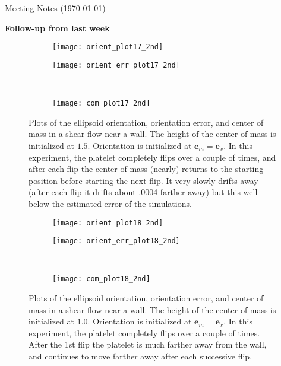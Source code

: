 \documentclass{article}
\newcommand{\vect}[1]{\boldsymbol{\mathbf{#1}}}
\begin{document}
\pagestyle{plain}

\begin{center}
  {\Large Meeting Notes (\today)}
\end{center}

{\large \textbf{Follow-up from last week}}

\begin{figure}[h!]
  \centering
  \begin{subfigure}{0.49\textwidth}
    \texttt{[image: orient\_plot17\_2nd]}
  \end{subfigure}
  \hfill
  \begin{subfigure}{0.49\textwidth}
    \texttt{[image: orient\_err\_plot17\_2nd]}
  \end{subfigure}
  \\
  \begin{subfigure}{0.49\textwidth}
    \texttt{[image: com\_plot17\_2nd]}
  \end{subfigure}
  \caption{Plots of the ellipsoid orientation, orientation error, and
     center of mass in a shear flow near a wall. The height of the
     center of mass is initialized at $1.5$. Orientation is initialized
     at $\vect{e}_m = \vect{e}_x$. In this experiment, the platelet
     completely flips over a couple of times, and after each flip the
     center of mass (nearly) returns to the starting position before starting
     the next flip. It very slowly drifts away (after each flip it
     drifts about .0004 farther away) but this well below the
     estimated error of the simulations.}
  \label{fig:plt17}
\end{figure}

\begin{figure}[h!]
  \centering
  \begin{subfigure}{0.49\textwidth}
    \texttt{[image: orient\_plot18\_2nd]}
  \end{subfigure}
  \hfill
  \begin{subfigure}{0.49\textwidth}
    \texttt{[image: orient\_err\_plot18\_2nd]}
  \end{subfigure}
  \\
  \begin{subfigure}{0.49\textwidth}
    \texttt{[image: com\_plot18\_2nd]}
  \end{subfigure}
  \caption{Plots of the ellipsoid orientation, orientation error, and
     center of mass in a shear flow near a wall. The height of the
     center of mass is initialized at $1.0$. Orientation is initialized
     at $\vect{e}_m = \vect{e}_x$. In this experiment, the platelet
     completely flips over a couple of times. After the 1st flip the
     platelet is much farther away from the wall, and continues to
     move farther away after each successive flip.}
  \label{fig:plt18}
\end{figure}
\end{document}
